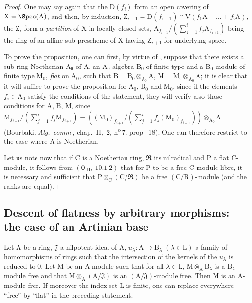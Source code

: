 \begin{proof}
One may say again that the $\mathrm{D}(f_i)$ form an open covering of $\mathrm{X}=\Spec(\mathrm{A})$, and then, by induction, $\mathrm{Z}_{i+1}=\mathrm{D}(f_{i+1})\cap\mathrm{V}(f_1\mathrm{A}+\ldots+f_i\mathrm{A})$, the $\mathrm{Z}_i$ form a \emph{partition} of $\mathrm{X}$ in locally closed sets, $\mathrm{A}_{f_{i+1}}/(\sum_{j=1}^{i}f_j\mathrm{A}_{f_{i+1}})$ being the ring of an affine sub-prescheme of $\mathrm{X}$ having $\mathrm{Z}_{i+1}$ for underlying space.

To prove the proposition, one can first, by virtue of , suppose that there exists a sub-ring Noetherian $\mathrm{A}_0$ of $\mathrm{A}$, an $\mathrm{A}_0$-algebra $\mathrm{B}_0$ of finite type and a $\mathrm{B}_0$-module of finite type $\mathrm{M}_0$, \emph{flat} on $\mathrm{A}_0$, such that $\mathrm{B}=\mathrm{B}_0\otimes_{\mathrm{A}_0}\mathrm{A}$, $\mathrm{M}=\mathrm{M}_0\otimes_{\mathrm{A}_0}\mathrm{A}$; it is clear that it will suffice to prove the proposition for $\mathrm{A}_0$, $\mathrm{B}_0$ and $\mathrm{M}_0$, since if the elements $f_i\in\mathrm{A}_0$ satisfy the conditions of the statement, they will verify also these conditions for $\mathrm{A}$, $\mathrm{B}$, $\mathrm{M}$, since $\mathrm{M}_{f_{i+1}}/(\sum_{j=1}^{i}f_j\mathrm{M}_{f_{i+1}})=((\mathrm{M}_0)_{f_{i+1}}/(\sum_{j=1}^{i}f_j(\mathrm{M}_0)_{f_{i+1}}))\otimes_{\mathrm{A}_0}\mathrm{A}$ (Bourbaki, \emph{Alg.\ comm.}, chap.~II, \textsection\,2, n\textsuperscript{o}\,7, prop.~18). One can therefore restrict to the case where $\mathrm{A}$ is Noetherian.

Let us note now that if $\mathrm{C}$ is a Noetherian ring, $\mathfrak{R}$ its nilradical and $\mathrm{P}$ a flat C-module, it follows from $(\mathbf{0}_{\mathrm{III}},~10.1.2)$ that for $\mathrm{P}$ to be a free C-module libre, it is necessary and sufficient that $\mathrm{P}\otimes_\mathrm{C}(\mathrm{C}/\mathfrak{R})$ be a free $(\mathrm{C}/\mathrm{R})$-module (and the ranks are equal).
\end{proof}

\subsection{Descent of flatness by arbitrary morphisms: the case of an Artinian base}
\label{subsection:IV.11.4}

\begin{theorem}[11.4.1]
\label{IV.11.4.1}
Let $\mathrm{A}$ be a ring, $\mathfrak{J}$ a nilpotent ideal of $\mathrm{A}$, $u_\lambda:\mathrm{A}\to\mathrm{B}_\lambda$ $(\lambda\in\mathrm{L})$
a family of homomorphisms of rings such that the intersection of the kernels of the $u_\lambda$ is reduced to $0$.
Let $\mathrm{M}$ be an $\mathrm{A}$-module such that for all $\lambda\in\mathrm{L}$, $\mathrm{M}\otimes_\mathrm{A}\mathrm{B}_\lambda$ is a $\mathrm{B}_\lambda$-module free and that $\mathrm{M}\otimes_\mathrm{A}(\mathrm{A}/\mathfrak{J})$
is an $(\mathrm{A}/\mathfrak{J})$-module free. Then $\mathrm{M}$ is an $\mathrm{A}$-module free. If moreover the index set $\mathrm{L}$ is
finite, one can replace everywhere ``free'' by ``flat'' in the preceding statement.
\end{theorem}

